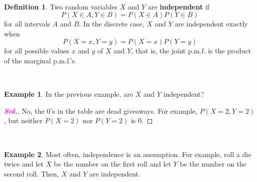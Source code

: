\documentclass[12pt,a4paper]{article}
\theoremstyle{definition}
\newtheorem{example}{Example}[section]
\theoremstyle{definition}
\newtheorem*{definition}{Definition}
\theoremstyle{definition}
\theoremstyle{definition}
\theoremstyle{remark}
\theoremstyle{definition}
\newcommand{\sol}{\textcolor{magenta}{\bf \textit{Sol.}}\quad}
\begin{document}
\
\begin{tcolorbox}[colback=white]
	\begin{definition}
		Two random variables $X$ and $Y$ are \textbf{independent} if \[
		P(X\in A, Y\in B)=P(X\in A)P(Y\in B)
		\] for all intervals $A$ and $B$. In the discrete case, $X$ and $Y$ are independent exactly when \[
		P(X=x,Y=y)=P(X=x)P(Y=y)
		\] for all possible values $x$ and $y$ of $X$ and $Y$, that is, the joint p.m.f. is the product of the marginal p.m.f.'s.
	\end{definition}
\end{tcolorbox}
\
\begin{example}
	In the previous example, are $X$ and $Y$ independent?\begin{proof}[\sol]
		No, the $0$'s in the table are dead giveaways. For example, $P(X=2,Y=2)$, but neither $P(X=2)$ nor $P(Y=2)$ is 0.
	\end{proof}
\end{example}
\
\begin{example}
	Most often, independence is an assumption. For example, roll a die twice and let $X$ be the number on the first roll and let $Y$ be the number on the second roll. Then, $X$ and $Y$ are independent.
\end{example}
\
\end{document}
